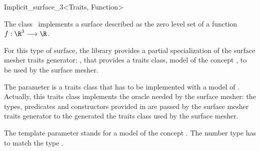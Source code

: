 

\begin{ccRefClass}{Implicit_surface_3<Traits, Function>}


\ccDefinition
  
The class \ccRefName\  implements a surface described 
as the zero level
set  of a function \begin{math}f : \R^3 \longrightarrow \R\end{math}.


For this type of surface, the library provides a partial specialization
of the  surface mesher traits generator:
,
that provides a traits class, model of the concept
,
to be used by the surface mesher.


The parameter  is a traits class 
that has to be implemented with a model of 
.
Actually, this traits class implements the oracle needed by the
surface mesher:
the types, predicates and constructors  provided
in  are
passed by the surface mesher traits generator
to the generated the traits class
used by the surface mesher.

The template parameter   stands for a model
of the concept .
The number type  has to match
the type .


\ccCreation
{}


\end{ccRefClass}
